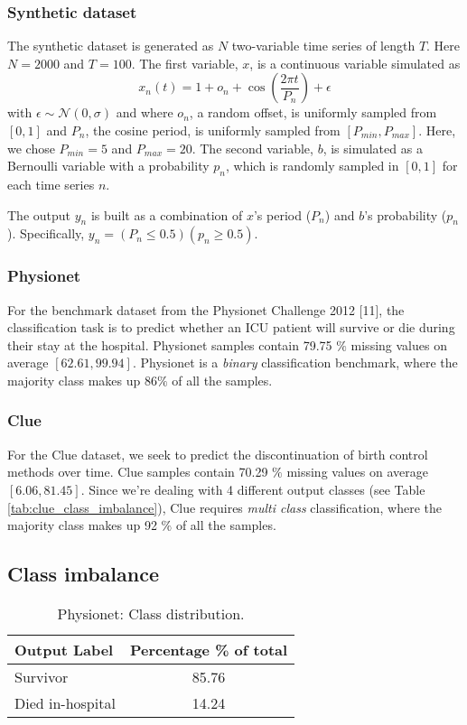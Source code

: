 \documentclass{article}
\begin{document}
\subsubsection*{Synthetic dataset}

The synthetic dataset is generated as $N$ two-variable time series of length $T$. Here $N = 2000$ and $T = 100$. The first variable, $x$, is a continuous variable simulated as $$x_n(t) = 1 + o_n + \cos(\frac{2\pi t}{P_n}) + \epsilon$$ with $\epsilon \sim  \mathcal{N}(0, \sigma) $ and where $o_n$, a random offset, is uniformly sampled from $[0,1]$ and $P_n$, the cosine period, is uniformly sampled from $[P_{min},P_{max}]$. Here, we chose $P_{min} = 5$ and $P_{max} = 20$. The second variable, $b$, is simulated as a Bernoulli variable with a probability $p_n$, which is randomly sampled in $[0,1]$ for each time series $n$.

The output $y_n$ is built as a combination of $x$'s period ($P_n$) and $b$'s probability ($p_n$). Specifically, $y_n = (P_n \leq 0.5) (p_n \geq 0.5)$.


\subsubsection*{Physionet}
For the benchmark dataset from the Physionet Challenge 2012 [11], the classification task is to predict whether an ICU patient will survive or die during their stay at the hospital.
Physionet samples contain 79.75 $\%$ missing values on average $[62.61, 99.94]$. Physionet is a \textit{binary} classification benchmark, where the majority class makes up 86$\%$ of all the samples.

\subsubsection*{Clue}
For the Clue dataset, we seek to predict the discontinuation of birth control methods over time.  
Clue samples contain 70.29 $\%$ missing values on average $[6.06, 81.45]$.
Since we're dealing with 4 different output classes (see Table \ref{tab:clue_class_imbalance}), Clue requires \textit{multi class} classification, where the majority class makes up 92 $\%$ of all the samples.


\subsection{\large Class imbalance}
\begin{table}[h]
\caption{\label{tab:physio_class_imbalance} Physionet: Class distribution.}
\vskip 0.15in
\begin{center}
\begin{sc}
\begin{tabular}{lc}
\toprule
Output Label & Percentage \% of total \\
\midrule
Survivor & 85.76 \\
Died in-hospital & 14.24 \\
\bottomrule
\end{tabular}
\end{sc}
\end{center}
\vskip -0.3in
\end{table}
\end{document}
